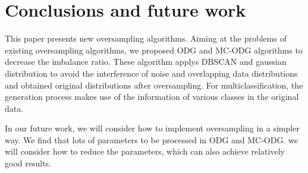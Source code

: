 \documentclass[runningheads]{llncs}
\begin{document}
\section{Conclusions and future work}
This paper presents new oversampling algorithms.
Aiming at the problems of existing oversampling algorithms, we proposed ODG and MC-ODG algorithms
to decrease the imbalance ratio. 
These algorithm applys DBSCAN and gaussian distribution to avoid the interference of noise
and overlapping data distributions and 
obtained original distributions after oversampling.
For multiclassification,
the generation process makes use of the information of various classes in the original data.

In our future work, we will consider how to implement oversampling in a simpler way.
We find that lots of parameters to be processed in ODG and MC-ODG. 
we will consider how to reduce the parameters, which can also achieve relatively good results.


  
  
\end{document}
